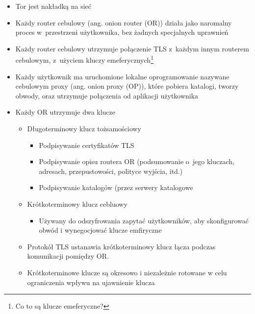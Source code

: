 \begin{itemize}
\begin{itemize}
   \item Tor jest nakładką na sieć
   \item Każdy router cebulowy (ang. onion router (OR)) działa jako naromalny proces w~przestrzeni użytkownika, bez żadnych specjalnych uprawnień
   \item Każdy router cebulowy utrzymuje połączenie TLS z~każdym innym routerem cebulowym, z~użyciem kluczy emeferycznych\footnote{Co to są klucze emeferyczne?}
   \item Każdy użytkownik ma uruchomione lokalne oprogramowanie nazywane cebulowym proxy (ang. onion proxy (OP)), które pobiera katalogi, tworzy obwody, oraz utrzymuje połączenia od aplikacji użytkownika
   \item Każdy OR utrzymuje dwa klucze
   \begin{itemize}
    \item Długoterminowy klucz tożsamościowy
    \begin{itemize}
     \item Podpisywanie certyfikatów TLS
     \item Podpisywanie opisu routera OR (podsumowanie o~jego kluczach, adresach, przepustowości, polityce wyjścia, itd.)
     \item Podpisywanie katalogów (przez serwery katalogowe
    \end{itemize}

    \item Krótkoterminowy klucz cebluowy
    \begin{itemize}
     \item Używany do odszyfrowania zapytać użytkowników, aby skonfigurować obwód i wynegocjować klucze emfiryczne
    \end{itemize}
    \item Protokół TLS ustanawia krótkoterminowy klucz łącza podczas komunikacji pomiędzy OR.
    \item Krótkoterminowe klucze są okresowo i niezależnie rotowane w celu ograniczenia wpływu na ujawnienie klucza

   \end{itemize}
   
  \end{itemize}

\end{itemize}


